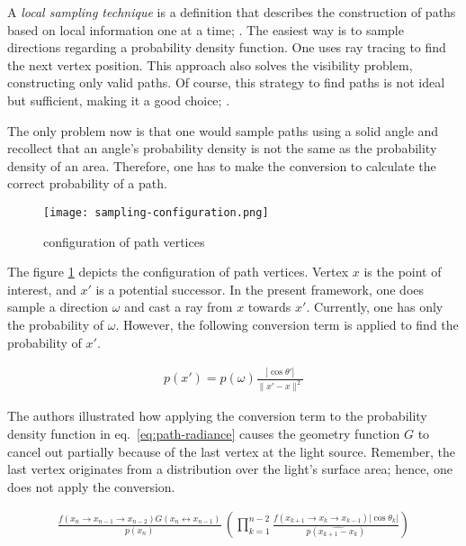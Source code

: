 A \textit{local sampling technique} is a definition that describes the construction of paths based on local information one at a time; \cite{veach_robust_1997}.
The easiest way is to sample directions regarding a probability density function.
One uses ray tracing to find the next vertex position.
This approach also solves the visibility problem, constructing only valid paths.
Of course, this strategy to find paths is not ideal but sufficient, making it a good choice; \cite{pharr_physically_2017}.

The only problem now is that one would sample paths using a solid angle and recollect that an angle's probability density is not the same as the probability density of an area.
Therefore, one has to make the conversion to calculate the correct probability of a path.

\begin{figure}[h]
    \begin{center}
        \texttt{[image: sampling-configuration.png]}
    \end{center}    
    \caption[]{configuration of path vertices}
    \label{fig:path-vertices}
\end{figure}

The figure \ref{fig:path-vertices} depicts the configuration of path vertices.
Vertex $x$ is the point of interest, and $x'$ is a potential successor.
In the present framework, one does sample a direction $\omega$ and cast a ray from $x$ towards $x'$.
Currently, one has only the probability of $\omega$.
However, the following conversion term is applied to find the probability of $x'$.

\begin{align*}
    p(x')=p(\omega)\frac{|\cos\theta'|}{\|x'-x\|^2}
\end{align*}

The authors \cite{pharr_physically_2017} illustrated how applying the conversion term to the probability density function in eq.~\ref{eq:path-radiance} causes the geometry function $G$ to cancel out partially because of the last vertex at the light source.
Remember, the last vertex originates from a distribution over the light's surface area; hence, one does not apply the conversion.

\begin{align*}
    \frac{f(x_{n}\rightarrow x_{n-1}\rightarrow x_{n-2})G(x_n\leftrightarrow x_{n-1})}{p(x_n)}\,\left(\prod_{k=1}^{n-2}\frac{f(x_{k+1}\rightarrow x_{k}\rightarrow x_{k-1})|\cos\theta_{k}|}{p(\widehat{x_{k+1}-x_{k}})}\right)
\end{align*}


